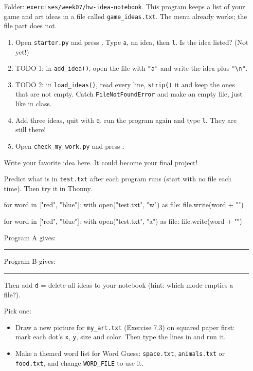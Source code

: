 \namedateline

\begin{core}
Folder: \texttt{exercises/week07/hw-idea-notebook}. This program keeps a list of your game and art ideas in a file called
\texttt{game\_ideas.txt}. The menu already works; the file part does not.
\begin{enumerate}[leftmargin=1.4em]
  \item Open \texttt{starter.py} and press . Type \texttt{a}, an idea, then \texttt{l}. Is the idea listed? (Not yet!)
  \item TODO 1: in \texttt{add\_idea()}, open the file with \texttt{"a"} and write the idea plus \texttt{"\textbackslash n"}.
  \item TODO 2: in \texttt{load\_ideas()}, read every line, \texttt{strip()} it and keep the ones that are not empty. Catch
        \texttt{FileNotFoundError} and make an empty file, just like in class.
  \item Add three ideas, quit with \texttt{q}, run the program again and type \texttt{l}. They are still there!
  \item Open \texttt{check\_my\_work.py} and press .
\end{enumerate}
Write your favorite idea here. It could become your final project!
\end{core}

\begin{challenge}
Predict what is in \texttt{test.txt} after each program runs (start with no file each time). Then try it in Thonny.
\begin{pycode}[Program A]
for word in ["red", "blue"]:
    with open("test.txt", "w") as file:
        file.write(word + "\n")
\end{pycode}
\begin{pycode}[Program B]
for word in ["red", "blue"]:
    with open("test.txt", "a") as file:
        file.write(word + "\n")
\end{pycode}
Program A gives: \rule{4cm}{0.4pt} \qquad Program B gives: \rule{4cm}{0.4pt}
\par Then add \texttt{d} = delete all ideas to your notebook (hint: which mode empties a file?).
\end{challenge}

\begin{creative}
Pick one:
\begin{itemize}[leftmargin=1.2em]
  \item Draw a new picture for \texttt{my\_art.txt} (Exercise 7.3) on squared paper first: mark each dot's \texttt{x}, \texttt{y}, size and color.
        Then type the lines in and run it.
  \item Make a themed word list for Word Guess: \texttt{space.txt}, \texttt{animals.txt} or \texttt{food.txt}, and change \texttt{WORD\_FILE} to use it.
\end{itemize}
\end{creative}

